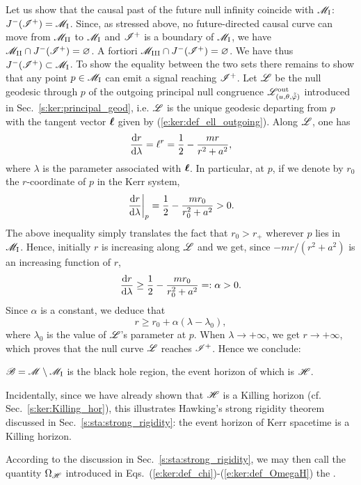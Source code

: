 Let us show that the causal past of the future null infinity
coincide with $\mathscr{M}_{\rm I}$: $J^{-}(\mathscr{I}^+)=\mathscr{M}_{\rm I}$.
Since, as stressed above, no future-directed causal curve can move from $\mathscr{M}_{\rm II}$ to $\mathscr{M}_{\rm I}$
and $\mathscr{I}^+$ is a boundary of $\mathscr{M}_{\rm I}$, we have $\mathscr{M}_{\rm II} \cap J^{-}(\mathscr{I}^+) = \varnothing$. A fortiori $\mathscr{M}_{\rm III} \cap J^{-}(\mathscr{I}^+) = \varnothing$.
We have thus $J^{-}(\mathscr{I}^+)\subset \mathscr{M}_{\rm I}$. To show the equality between the
two sets there remains to show
that any point $p\in \mathscr{M}_{\rm I}$ can emit a signal reaching $\mathscr{I}^+$.
Let $\mathscr{L}$ be the null geodesic through $p$ of the outgoing principal null
congruence $\mathscr{L}^{\rm out}_{(u,\theta,\tilde{{\tilde\varphi}})}$ introduced in Sec.~\ref{s:ker:principal_geod}, i.e. $\mathscr{L}$ is the unique geodesic departing
from $p$ with the tangent vector $\bm{\ell}$ given by
(\ref{e:ker:def_ell_outgoing}). Along $\mathscr{L}$, one has
\[
   \frac{\mathrm{d} r}{\mathrm{d}\lambda} = \ell^r = \frac{1}{2} - \frac{m r}{r^2 + a^2} ,
\]
where $\lambda$ is the parameter associated with $\bm{\ell}$.
In particular, at $p$, if we denote by $r_0$ the $r$-coordinate of $p$ in the Kerr system,
\[
    \left. \frac{\mathrm{d} r}{\mathrm{d}\lambda} \right| _{p} = \frac{1}{2} - \frac{m r_0}{r_0^2 + a^2} > 0 .
\]
The above inequality simply translates the fact that $r_0 > r_+$ wherever $p$ lies in
$\mathscr{M}_{\rm I}$.
Hence, initially $r$ is increasing along $\mathscr{L}$ and we get, since $-mr/(r^2+a^2)$ is an
increasing function of $r$,
\[
    \frac{\mathrm{d} r}{\mathrm{d}\lambda} \geq \frac{1}{2} - \frac{m r_0}{r_0^2 + a^2} =: \alpha > 0.
\]
Since $\alpha$ is a constant, we deduce that
\[
    r \geq r_0 + \alpha(\lambda - \lambda_0) ,
\]
where $\lambda_0$ is the value of $\mathscr{L}$'s parameter at $p$. When $\lambda\rightarrow +\infty$,
we get $r\rightarrow +\infty$, which proves that the null curve $\mathscr{L}$
reaches $\mathscr{I}^+$. Hence we conclude:
\begin{prop}
$\mathscr{B} = \mathscr{M} \setminus \mathscr{M}_{\rm I}$ is the black hole region, the event
horizon of which is $\mathscr{H}$.
\end{prop}
Incidentally, since we have already shown that $\mathscr{H}$ is a Killing horizon
(cf. Sec.~\ref{s:ker:Killing_hor}),
this illustrates Hawking's strong rigidity theorem discussed
in Sec.~\ref{s:sta:strong_rigidity}: the event horizon of Kerr spacetime
is a Killing horizon.

According to the discussion in Sec.~\ref{s:sta:strong_rigidity}, we may then
call the quantity $\Omega_{\mathscr{H}}$ introduced in
Eqs.~(\ref{e:ker:def_chi})-(\ref{e:ker:def_OmegaH}) the
.

